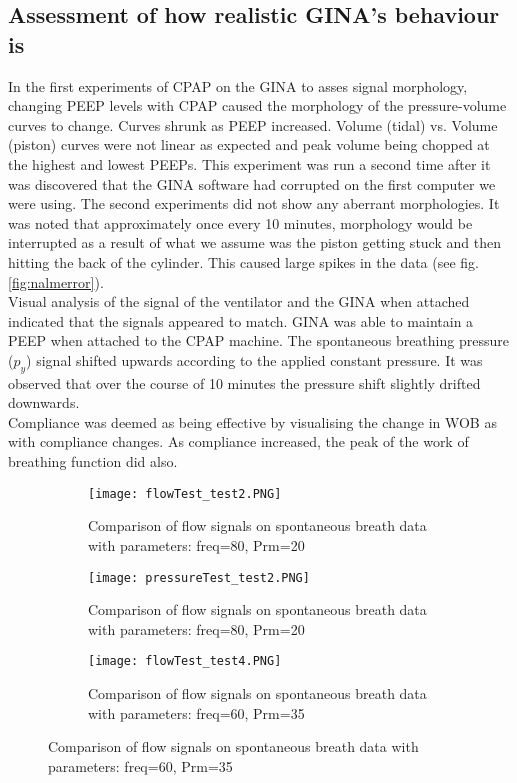 \documentclass[12pt, openany, oneside]{book}
\begin{document}
\subsection{Assessment of how realistic GINA's behaviour is}
In the first experiments of CPAP on the GINA to asses signal morphology, changing PEEP levels with CPAP caused the morphology of the pressure-volume curves to change. Curves shrunk as PEEP increased. Volume (tidal) vs. Volume (piston) curves were not linear as expected and peak volume being chopped at the highest and lowest PEEPs. This experiment was run a second time after it was discovered that the GINA software had corrupted on the first computer we were using. The second experiments did not show any aberrant morphologies. It was noted that approximately once every 10 minutes, morphology would be interrupted as a result of what we assume was the piston getting stuck and then hitting the back of the cylinder. This caused large spikes in the data (see fig. \ref{fig:nalmerror}).\\

Visual analysis of the signal of the ventilator and the GINA when attached indicated that the signals appeared to match. GINA was able to maintain a PEEP when attached to the CPAP machine. The spontaneous breathing pressure ($p_y$) signal shifted upwards according to the applied constant pressure. It was observed that over the course of 10 minutes the pressure shift slightly drifted downwards.\\

\newpage
Compliance was deemed as being effective by visualising the change in WOB as with compliance changes. As compliance increased, the peak of the work of breathing function did also.\\



\begin{figure}

\begin{subfigure}[t]{0.99\textwidth}
		\centering
		\texttt{[image: flowTest\_test2.PNG]}		
		\caption{Comparison of flow signals on spontaneous breath data with parameters: freq=80, Prm=20}
		\label{fig:f2}
	\end{subfigure}
	

	\begin{subfigure}[t]{0.99\textwidth}
		\centering
		\texttt{[image: pressureTest\_test2.PNG]}
		
		\caption{Comparison of flow signals on spontaneous breath data with parameters: freq=80, Prm=20}
		\label{fig:p2}
	\end{subfigure}

	\medskip

	\begin{subfigure}[t]{0.99\textwidth}
		\centering
		\texttt{[image: flowTest\_test4.PNG]}
		
		\caption{Comparison of flow signals on spontaneous breath data with parameters: freq=60, Prm=35}
		\label{fig:f4}
	\end{subfigure}

\end{figure}
\end{document}
